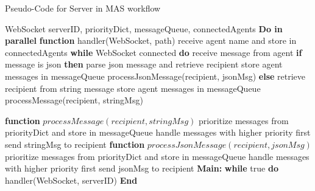 \begin{breakablealgorithm}
    \caption{Pseudo-Code for Server in MAS workflow}
    \label{alg:ServerPseudoCode}
    \begin{algorithmic}[1]
         WebSocket
         serverID, priorityDict, messageQueue, connectedAgents
        \State \textbf{Do in parallel}
        \State \textbf{\qquad function} handler(WebSocket, path)  
        \State \textbf \qquad \qquad receive agent name and store in connectedAgents
        \State \textbf {\qquad \qquad while} WebSocket connected \textbf{do} 
        \State \textbf \qquad \qquad \qquad receive message from agent   
        \State \textbf{\qquad \qquad \qquad if} {message is json} \textbf{then}
        \State \textbf \qquad \qquad \qquad \qquad parse json message and retrieve recipient
        \State \textbf \qquad \qquad \qquad \qquad store agent messages in messageQueue  
        \State \textbf \qquad \qquad \qquad \qquad processJsonMessage(recipient, jsonMsg)
        \State \textbf{\qquad \qquad \qquad else}  
        \State \textbf \qquad \qquad \qquad \qquad retrieve recipient from string message
        \State \textbf \qquad \qquad \qquad \qquad store agent messages in messageQueue  
        \State \textbf \qquad \qquad \qquad \qquad processMessage(recipient, stringMsg)
        
        \State \textbf{\qquad function} $processMessage(recipient, stringMsg)$   
        \State \textbf \qquad \qquad prioritize messages from priorityDict and store in messageQueue 
        \State \textbf \qquad \qquad handle messages with higher priority first   
        \State \textbf \qquad \qquad send stringMsg to recipient 
        \State \textbf{\qquad function} $processJsonMessage(recipient, jsonMsg)$   
        \State \textbf \qquad \qquad prioritize messages from priorityDict and store in messageQueue
        \State \textbf \qquad \qquad handle messages with higher priority first 
        \State \textbf \qquad \qquad send jsonMsg to recipient
        \State \textbf{Main:}   
        \State \textbf {\qquad while} true \textbf {do}
        \State \textbf \qquad \qquad handler(WebSocket, serverID) 
        \State \textbf{End}                 
    \end{algorithmic}
\end{breakablealgorithm}

